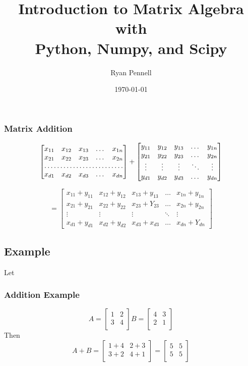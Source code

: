 \documentclass{beamer}
\title[Short title]{Introduction to Matrix Algebra\\ with\\ Python, Numpy, and Scipy} %
\author{Ryan Pennell} %
\institute[Ivy Tech] %
{
Ivy Tech \\ %
\medskip
\textit{contact@ryanpennell.xyz} %
}
\date{\today} %
\begin{document}
\begin{frame}
\titlepage %
\end{frame}

\begin{frame}
\frametitle{Matrix Addition}

\[
\begin{bmatrix}
    x_{11}       & x_{12} & x_{13} & \dots & x_{1n} \\
    x_{21}       & x_{22} & x_{23} & \dots & x_{2n} \\
    \hdotsfor{5} \\
    x_{d1}       & x_{d2} & x_{d3} & \dots & x_{dn}
\end{bmatrix}
+
\begin{bmatrix}
    y_{11} & y_{12} & y_{13} & \dots  & y_{1n} \\
    y_{21} & y_{22} & y_{23} & \dots  & y_{2n} \\
    \vdots & \vdots & \vdots & \ddots & \vdots \\
    y_{d1} & y_{d2} & y_{d3} & \dots  & y_{dn}
\end{bmatrix}
\]

\[
=
\begin{bmatrix}
	x_{11}+ y_{11}  &  x_{12}+ y_{12} & x_{13}+ y_{13} & \dots & x_{1n}+y_{1n}\\
	x_{21}+y_{21}   & x_{22}+y_{22} & x_{23}+Y_{23} & \dots & x_{2n}+y_{2n} \\
	\vdots & \vdots & \vdots & \ddots & \vdots \\
	x_{d1}+y_{d1}  & x_{d2}+y_{d2} & x_{d3}+x_{d3} & \dots & x_{dn}+Y_{dn}
\end{bmatrix}
\]

\end{frame}

\begin{frame}
\section{Example}
Let
\frametitle{Addition Example}
\[A=
\begin{bmatrix}
	1 & 2 \\
	3 & 4\\
\end{bmatrix}
B=
\begin{bmatrix}
	4 & 3\\
	2 & 1\\
\end{bmatrix}
\]
Then 
\[
A+B=
\begin{bmatrix}
	1+4 & 2+3\\
	3+2 & 4+1 \\
\end{bmatrix}
=
\begin{bmatrix}
	5 & 5\\
	5 & 5\\	
\end{bmatrix}
\]
\end{frame}
\end{document}
